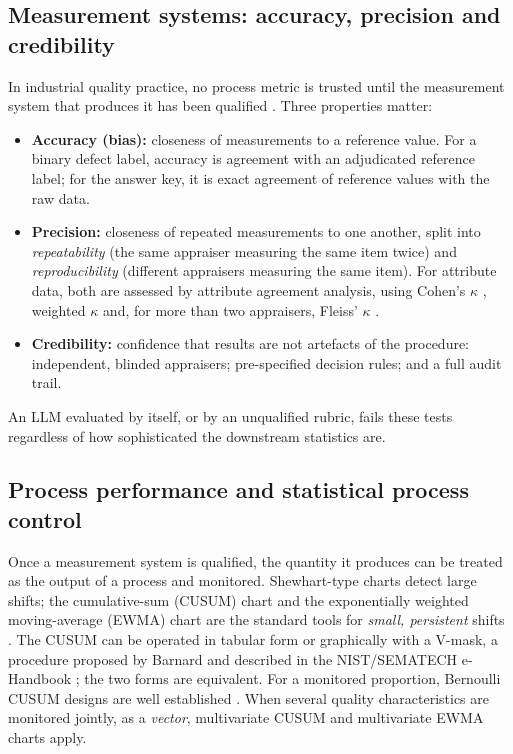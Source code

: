 \documentclass[11pt]{article}
\begin{document}
\subsection{Measurement systems: accuracy, precision and credibility}
In industrial quality practice, no process metric is trusted until the measurement system that produces it has been qualified \citep{aiag2010msa}. Three properties matter:
\begin{itemize}[leftmargin=*]
\item \textbf{Accuracy (bias):} closeness of measurements to a reference value. For a binary defect label, accuracy is agreement with an adjudicated reference label; for the answer key, it is exact agreement of reference values with the raw data.
\item \textbf{Precision:} closeness of repeated measurements to one another, split into \emph{repeatability} (the same appraiser measuring the same item twice) and \emph{reproducibility} (different appraisers measuring the same item). For attribute data, both are assessed by attribute agreement analysis, using Cohen's $\kappa$ \citep{cohen1960}, weighted $\kappa$ \citep{cohen1968} and, for more than two appraisers, Fleiss' $\kappa$ \citep{fleiss1971}.
\item \textbf{Credibility:} confidence that results are not artefacts of the procedure: independent, blinded appraisers; pre-specified decision rules; and a full audit trail.
\end{itemize}
An LLM evaluated by itself, or by an unqualified rubric, fails these tests regardless of how sophisticated the downstream statistics are.

\subsection{Process performance and statistical process control}
Once a measurement system is qualified, the quantity it produces can be treated as the output of a process and monitored. Shewhart-type charts detect large shifts; the cumulative-sum (CUSUM) chart \citep{page1954} and the exponentially weighted moving-average (EWMA) chart \citep{roberts1959,lucas1990} are the standard tools for \emph{small, persistent} shifts \citep{montgomery2019}. The CUSUM can be operated in tabular form or graphically with a V-mask, a procedure proposed by Barnard and described in the NIST/SEMATECH e-Handbook \citep{nist}; the two forms are equivalent. For a monitored proportion, Bernoulli CUSUM designs are well established \citep{reynolds1999}. When several quality characteristics are monitored jointly, as a \emph{vector}, multivariate CUSUM \citep{crosier1988} and multivariate EWMA \citep{lowry1992} charts apply.
\end{document}

